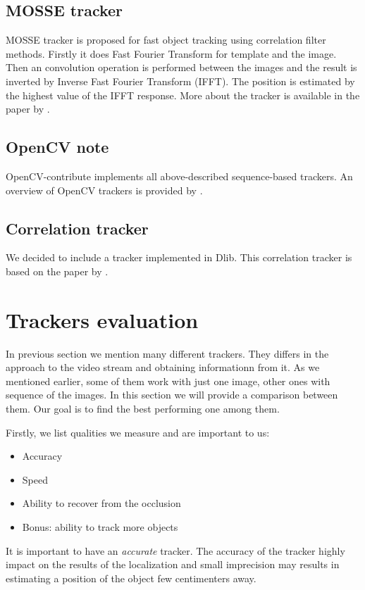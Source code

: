 \subsection*{MOSSE tracker}
MOSSE tracker is proposed for fast object tracking using correlation filter
methods. Firstly it does Fast Fourier Transform for template and the image.
Then an convolution operation is performed between the images and the result is
inverted by Inverse Fast Fourier Transform (IFFT). The position is estimated by
the highest value of the IFFT response. More about the tracker is available in
the paper by \citet*{mosse}.

\subsection*{OpenCV note}
OpenCV-contribute implements all above-described sequence-based trackers. An
overview of OpenCV trackers is provided by \citet*{opencv-trackers}.

\subsection*{Correlation tracker}
We decided to include a tracker implemented in Dlib. This
correlation tracker is based on the paper by \citet*{correlation}.


\section{Trackers evaluation}

In previous section we mention many different trackers. They differs in the
approach to the video stream and obtaining informationn from it. As we
mentioned earlier, some of them work with just one image, other ones with
sequence of the images. In this section we will provide a comparison between
them. Our goal is to find the best performing one among them.

Firstly, we list qualities we measure and are important to us:
\begin{itemize}
	\item Accuracy
	\item Speed
	\item Ability to recover from the occlusion
	\item Bonus: ability to track more objects
\end{itemize}

It is important to have an \emph{accurate} tracker. The accuracy of the tracker highly
impact on the results of the localization and small imprecision may results in
estimating a position of the object few centimenters away.

